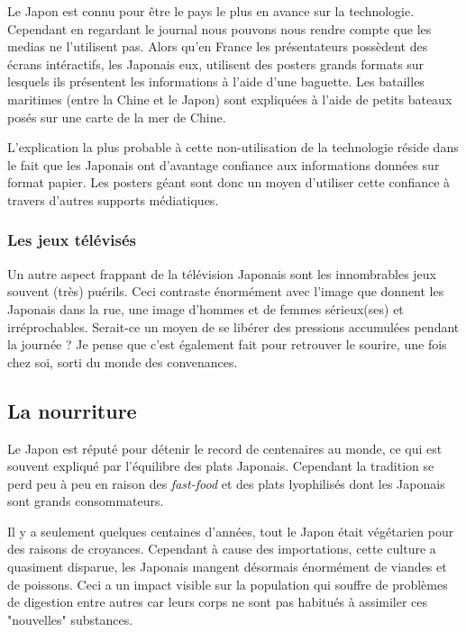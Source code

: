 \documentclass[11pt,journal]{RapportFR}
\begin{document}
\begin{CJK*}{UTF8}{min}
Le Japon est connu pour \^etre le pays le plus en avance sur la technologie. Cependant en regardant le journal nous pouvons nous rendre compte que les medias ne l'utilisent pas. Alors qu'en France les pr\'esentateurs poss\`edent des \'ecrans int\'eractifs, les Japonais eux, utilisent des posters grands formats sur lesquels ils pr\'esentent les informations \`a l'aide d'une baguette.
Les batailles maritimes (entre la Chine et le Japon) sont expliqu\'ees \`a l'aide de petits bateaux pos\'es sur une carte de la mer de Chine.

L'explication la plus probable \`a cette non-utilisation de la technologie r\'eside dans le fait que les Japonais ont d'avantage confiance aux informations donn\'ees sur format papier. Les posters g\'eant sont donc un moyen d'utiliser cette confiance \`a travers d'autres supports m\'ediatiques.  

\subsubsection{Les jeux t\'el\'evis\'es}

Un autre aspect frappant de la t\'el\'evision Japonais sont les innombrables jeux souvent (tr\`es) pu\'erils. Ceci contraste \'enorm\'ement avec l'image que donnent les Japonais dans la rue, une image d'hommes et de femmes s\'erieux(ses) et irr\'eprochables. 
Serait-ce un moyen de se lib\'erer des pressions accumul\'ees pendant la journ\'ee ? Je pense que c'est \'egalement fait pour retrouver le sourire, une fois chez soi, sorti du monde des convenances. 

\subsection{La nourriture}

Le Japon est r\'eput\'e pour d\'etenir le record de centenaires au monde, ce qui est souvent expliqu\'e par l'\'equilibre des plats Japonais. Cependant la tradition se perd peu \`a peu en raison des \textit{fast-food} et des plats lyophilis\'es dont les Japonais sont grands consommateurs.

Il y a seulement quelques centaines d'ann\'ees, tout le Japon \'etait v\'eg\'etarien pour des raisons de croyances. Cependant \`a cause des importations, cette culture a quasiment disparue, les Japonais mangent d\'esormais \'enorm\'ement de viandes et de poissons. Ceci a un impact visible sur la population qui souffre de probl\`emes de digestion entre autres car leurs corps ne sont pas habitu\'es \`a assimiler ces "nouvelles" substances.


\end{CJK*}
\end{document}
